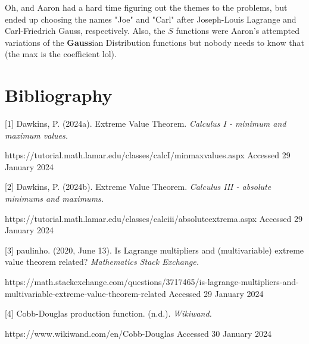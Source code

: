Oh, and Aaron had a hard time figuring out the themes to the problems, but ended up choosing the names "Joe" and "Carl" after Joseph-Louis Lagrange and Carl-Friedrich Gauss, respectively.
\tiny
Also, the $S$ functions were Aaron's attempted variations of the \textbf{Gauss}ian Distribution functions but nobody needs to know that (the max is the coefficient lol).
\normalsize
\setcounter{chapter}{14}
\chapter{Bibliography}
\small
[1] Dawkins, P. (2024a). Extreme Value Theorem. \textit{Calculus I - minimum and maximum values.}
\begin{changemargin}{0.55cm}{0cm}
	https://tutorial.math.lamar.edu/classes/calcI/minmaxvalues.aspx Accessed 29 January 2024
\end{changemargin}

\vspace{\baselineskip}
[2] Dawkins, P. (2024b). Extreme Value Theorem. \textit{Calculus III - absolute minimums and maximums.}
\begin{changemargin}{0.55cm}{0cm}
	https://tutorial.math.lamar.edu/classes/calciii/absoluteextrema.aspx Accessed 29 January 2024
\end{changemargin}

\vspace{\baselineskip}
[3] paulinho. (2020, June 13). Is Lagrange multipliers and (multivariable) extreme value theorem related? \textit{Mathematics Stack Exchange.}
\begin{changemargin}{0.55cm}{0cm}
	https://math.stackexchange.com/questions/3717465/is-lagrange-multipliers-and-multivariable-extreme-value-theorem-related Accessed 29 January 2024
\end{changemargin}

\vspace{\baselineskip}
[4] Cobb-Douglas production function. (n.d.). \textit{Wikiwand.}
\begin{changemargin}{0.55cm}{0cm}
	https://www.wikiwand.com/en/Cobb-Douglas Accessed 30 January 2024 
\end{changemargin}